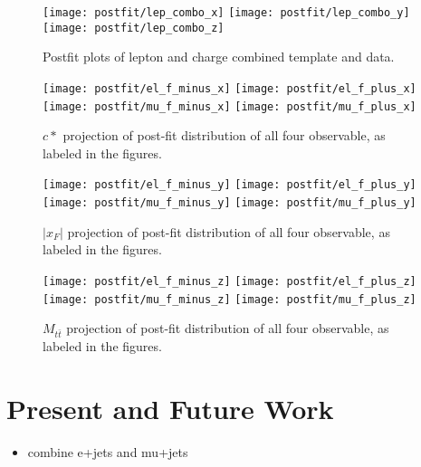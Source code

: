 \documentclass{cmspaperpdf}
\begin{document}
\begin{figure}[hbt]
  \begin{center}
    \texttt{[image: postfit/lep\_combo\_x]}
    \texttt{[image: postfit/lep\_combo\_y]}
    \texttt{[image: postfit/lep\_combo\_z]}
  \caption{\small Postfit plots of lepton and charge combined template and data.}
    \label{fig:postfit combined}
  \end{center}
\end{figure}

\begin{figure}[hbt]
  \begin{center}
    \texttt{[image: postfit/el\_f\_minus\_x]}
    \texttt{[image: postfit/el\_f\_plus\_x]}
    \texttt{[image: postfit/mu\_f\_minus\_x]}
    \texttt{[image: postfit/mu\_f\_plus\_x]}
  \caption{\small $c*$ projection of post-fit distribution of all four observable, as labeled in the figures.}
    \label{fig:postfit c*}
  \end{center}
\end{figure}

\begin{figure}[hbt]
  \begin{center}
    \texttt{[image: postfit/el\_f\_minus\_y]}
    \texttt{[image: postfit/el\_f\_plus\_y]}
    \texttt{[image: postfit/mu\_f\_minus\_y]}
    \texttt{[image: postfit/mu\_f\_plus\_y]}
  \caption{\small $|x_F|$ projection of post-fit distribution of all four observable, as labeled in the figures.}
    \label{fig:postfit xf}
  \end{center}
\end{figure}

\begin{figure}[hbt]
  \begin{center}
    \texttt{[image: postfit/el\_f\_minus\_z]}
    \texttt{[image: postfit/el\_f\_plus\_z]}
    \texttt{[image: postfit/mu\_f\_minus\_z]}
    \texttt{[image: postfit/mu\_f\_plus\_z]}
  \caption{\small $M_{t\bar t}$ projection of post-fit distribution of all four observable, as labeled in the figures.}
    \label{fig:postfit mtt}
  \end{center}
\end{figure}


\clearpage
\section{Present and Future Work}
\begin{itemize}
\item combine e+jets and mu+jets
\end{itemize}
\end{document}
